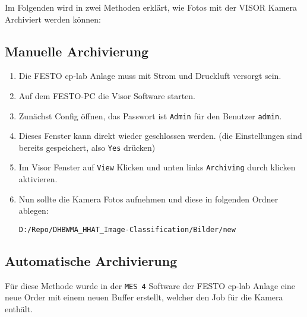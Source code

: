 Im Folgenden wird in zwei Methoden erklärt, wie Fotos mit der VISOR Kamera Archiviert werden können:

\subsection{Manuelle Archivierung}

\begin{enumerate} 
    \item Die FESTO \ac{cp-lab} Anlage muss mit Strom und Druckluft versorgt sein.
    \item Auf dem FESTO-PC die Visor Software starten.
    \item Zunächst Config öffnen, das Passwort ist \texttt{Admin} für den Benutzer \texttt{admin}.
    \item Dieses Fenster kann direkt wieder geschlossen werden. (die Einstellungen sind bereits gespeichert, also \texttt{Yes} drücken)
    \item Im Visor Fenster auf \texttt{View} Klicken und unten links \texttt{Archiving} durch klicken aktivieren.
    \item Nun sollte die Kamera Fotos aufnehmen und diese in folgenden Ordner ablegen:
    
    \texttt{D:/Repo/DHBWMA\_HHAT\_Image-Classification/Bilder/new}

\end{enumerate}

\subsection{Automatische Archivierung}

Für diese Methode wurde in der \texttt{MES 4} Software der FESTO \ac{cp-lab} Anlage eine neue Order mit einem neuen Buffer erstellt, welcher den Job für die Kamera enthält. 

